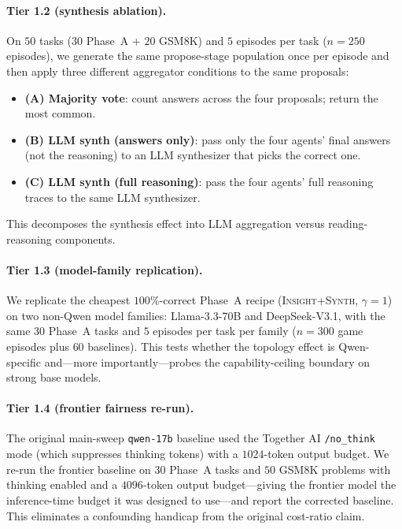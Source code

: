 \documentclass[11pt]{amsart}
\newcommand{\g}{\gamma}
\newcommand\1{{\mathds{1}}}
\theoremstyle{definition}
\theoremstyle{remark}
\numberwithin{equation}{section}
\begin{document}
\paragraph{Tier 1.2 (synthesis ablation).}
On $50$ tasks ($30$ Phase~A + $20$ GSM8K) and $5$ episodes per task ($n = 250$ episodes), we generate the same propose-stage population once per episode and then apply three different aggregator conditions to the same proposals:
\begin{itemize}[leftmargin=1.2em, itemsep=1pt]
\item \textbf{(A) Majority vote}: count answers across the four proposals; return the most common.
\item \textbf{(B) LLM synth (answers only)}: pass only the four agents' final answers (not the reasoning) to an LLM synthesizer that picks the correct one.
\item \textbf{(C) LLM synth (full reasoning)}: pass the four agents' full reasoning traces to the same LLM synthesizer.
\end{itemize}
This decomposes the synthesis effect into LLM aggregation versus reading-reasoning components.

\paragraph{Tier 1.3 (model-family replication).}
We replicate the cheapest $100\%$-correct Phase~A recipe (\textsc{Insight+Synth}, $\g=1$) on two non-Qwen model families: Llama-3.3-70B and DeepSeek-V3.1, with the same $30$ Phase~A tasks and $5$ episodes per task per family ($n = 300$ game episodes plus $60$ baselines).
This tests whether the topology effect is Qwen-specific and---more importantly---probes the capability-ceiling boundary on strong base models.

\paragraph{Tier 1.4 (frontier fairness re-run).}
The original main-sweep \texttt{qwen-17b} baseline used the Together AI \texttt{/no\_think} mode (which suppresses thinking tokens) with a $1024$-token output budget.
We re-run the frontier baseline on $30$ Phase~A tasks and $50$ GSM8K problems with thinking enabled and a $4096$-token output budget---giving the frontier model the inference-time budget it was designed to use---and report the corrected baseline.
This eliminates a confounding handicap from the original cost-ratio claim.
\end{document}
